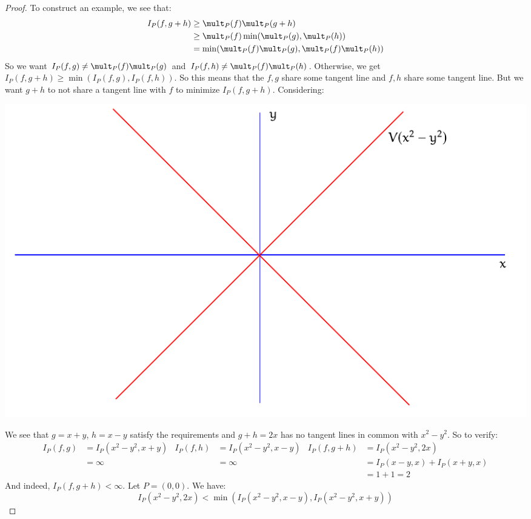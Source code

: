 \documentclass{article}
\begin{document}
\begin{itemize}
\begin{proof}
                To construct an example, we see that:
                    \begin{align*}
                        I_{P}(f, g + h) &\geq \mult_{P}(f)\mult_{P}(g + h) \\
                                        &\geq \mult_{P}(f)\min(\mult_{P}(g), \mult_{P}(h)) \\
                                        &= \min(\mult_{P}(f)\mult_{P}(g), \mult_{P}(f)\mult_{P}(h))
                    \end{align*}
                So we want $I_{P}(f, g) \neq \mult_{P}(f)\mult_{P}(g)$ and $I_{P}(f, h) \neq \mult_{P}(f)\mult_{P}(h)$. Otherwise, we get $I_{P}(f, g + h) \geq \min(I_{P}(f, g), I_{P}(f, h))$. So this means that the $f, g$ share some tangent line and $f, h$ share some tangent line. But we want $g + h$ to not share a tangent line with $f$ to minimize $I_{P}(f,g + h)$. Considering:
                    \begin{center}
                        \includegraphics[scale=.8]{Exercise3}
                    \end{center}
                We see that $g = x + y$, $h = x - y$ satisfy the requirements and $g + h = 2x$ has no tangent lines in common with $x^{2} - y^{2}$. So to verify:
                    \begin{align*}
                        I_{P}(f, g) &= I_{P}(x^{2} - y^{2}, x + y) & I_{P}(f, h) &= I_{P}(x^{2} - y^{2}, x - y) & I_{P}(f, g + h) &= I_{P}(x^{2} - y^{2}, 2x)          \\
                                    &= \infty                      &             &= \infty                      &                 &= I_{P}(x - y, x) + I_{P}(x + y, x) \\
                                    &                              &             &                              &                 &= 1 + 1 = 2                           
                    \end{align*}
                And indeed, $I_{P}(f, g + h) < \infty$. Let $P = (0, 0)$. We have:
                    \begin{equation*}
                        I_{P}(x^{2} - y^{2}, 2x) < \min(I_{P}(x^{2} - y^{2}, x - y), I_{P}(x^{2} - y^{2}, x + y))
                    \end{equation*}
            \end{proof}
    \end{itemize}
\end{document}
